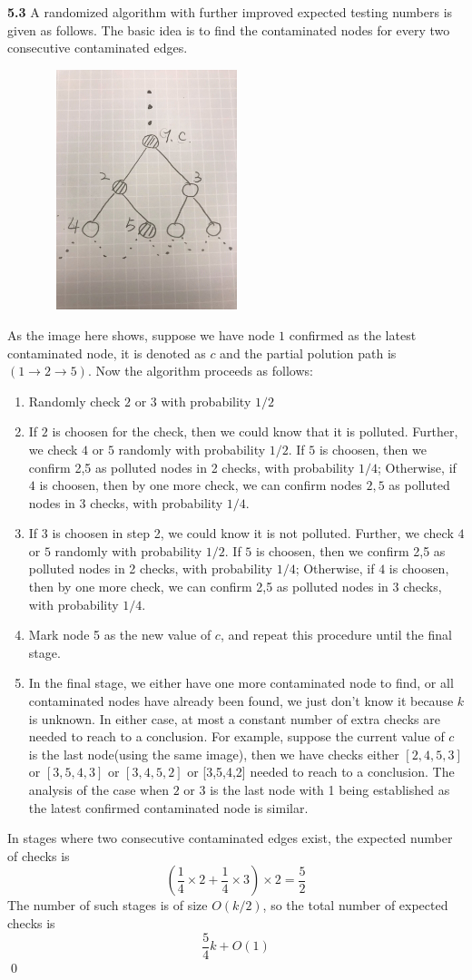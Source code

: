 \documentclass[10pt]{article}
\begin{document}
\textbf{5.3} A randomized algorithm with further improved expected testing numbers is given as follows. The basic idea is to find the contaminated nodes for every two consecutive contaminated edges.\\
\begin{figure}[h]
\includegraphics[width=6cm, height=7cm]{1}
\centering
\end{figure}
As the image here shows, suppose we have node $1$ confirmed as the latest contaminated node, it is denoted as $c$ and the partial polution path is $(1 \to 2 \to 5)$. Now the algorithm proceeds as follows:
\begin{enumerate}
	\item Randomly check $2$ or $3$ with probability $1/2$
	\item If $2$ is choosen for the check, then we could know that it is polluted. Further, we check $4$ or $5$ randomly with probability $1/2$. If $5$ is choosen, then we confirm  2,5 as polluted nodes in 2 checks, with probability $1/4$; Otherwise, if $4$ is choosen, then by one more check, we can confirm nodes $2,5$ as polluted nodes in 3 checks, with probability $1/4$.
	\item If 3 is choosen in step 2, we could know it is not polluted.  Further, we check $4$ or $5$ randomly with probability $1/2$. If $5$ is choosen, then we confirm 2,5 as polluted nodes in 2 checks, with probability $1/4$; Otherwise, if $4$ is choosen, then by one more check, we can confirm  2,5 as polluted nodes in 3 checks, with probability $1/4$.
	\item Mark node 5 as the new value of $c$, and repeat this procedure until the final stage.
	\item In the final stage, we either have one more contaminated node to find, or all contaminated nodes have already been found, we just don't know it because $k$ is unknown. In either case, at most a constant number of extra checks are needed to reach to a conclusion. For example, suppose the current value of $c$ is the last node(using the same image), then we have checks either $[2,4,5,3]$ or $[3,5,4,3]$ or $[3,4,5,2]$ or [3,5,4,2] needed to reach to a conclusion. The analysis of the case when $2$ or $3$ is the last node with 1 being established as the latest confirmed contaminated node is similar.
\end{enumerate}
In stages where two consecutive contaminated edges exist, the expected number of checks is 
\[(\frac{1}{4} \times 2 + \frac{1}{4} \times 3) \times 2 = \frac{5}{2}\]
The number of such stages is of size $O(k/2)$, so the total number of expected checks is
\[\dfrac{5}{4}k + O(1)\]
\qed
\end{document}
